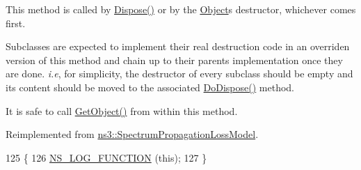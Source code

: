 This method is called by \hyperlink{classns3_1_1Object_aa90ae598863f6c251cdab3c3722afdaf}{Dispose()} or by the \hyperlink{classns3_1_1Object}{Object}\textquotesingle{}s destructor, whichever comes first.

Subclasses are expected to implement their real destruction code in an overriden version of this method and chain up to their parent\textquotesingle{}s implementation once they are done. {\itshape i.\+e}, for simplicity, the destructor of every subclass should be empty and its content should be moved to the associated \hyperlink{classns3_1_1MmWaveBeamforming_a654b8ccaa5f9ee98b44e7f5dfc007eca}{Do\+Dispose()} method.

It is safe to call \hyperlink{classns3_1_1Object_a13e18c00017096c8381eb651d5bd0783}{Get\+Object()} from within this method. 

Reimplemented from \hyperlink{classns3_1_1SpectrumPropagationLossModel_a26259057c97ea893d472b5ac52d6649e}{ns3\+::\+Spectrum\+Propagation\+Loss\+Model}.


\begin{DoxyCode}
125 \{
126         \hyperlink{log-macros-disabled_8h_a90b90d5bad1f39cb1b64923ea94c0761}{NS\_LOG\_FUNCTION} (\textcolor{keyword}{this});
127 \}
\end{DoxyCode}
